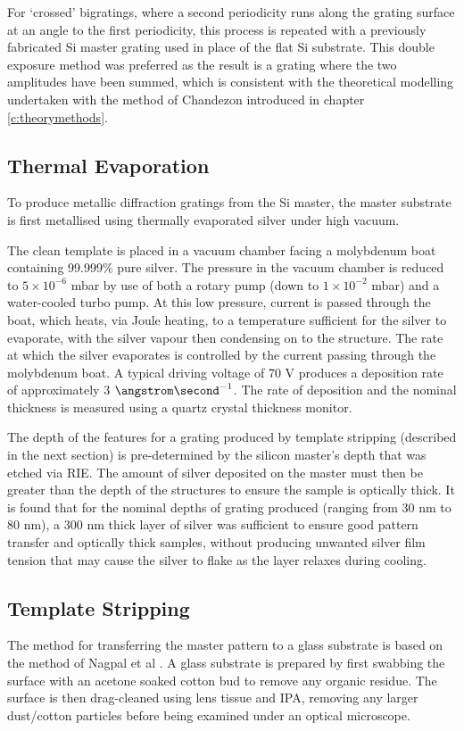For `crossed' bigratings, where a second periodicity runs along the grating surface at an angle to the first periodicity, this process is repeated with a previously fabricated Si master grating used in place of the flat Si substrate. This double exposure method was preferred as the result is a grating where the two amplitudes have been summed, which is consistent with the theoretical modelling undertaken with the method of Chandezon introduced in chapter \ref{c:theorymethods}.
 
\subsection{Thermal Evaporation} 
To produce metallic diffraction gratings from the Si master, the master substrate is first metallised using thermally evaporated silver under high vacuum.

The clean template is placed in a vacuum chamber facing a molybdenum boat containing 99.999\% pure silver. The pressure in the vacuum chamber is reduced to $5\times 10^{-6}$ mbar by use of both a rotary pump (down to $1\times10^{-2}$ mbar) and a water-cooled turbo pump. 
At this low pressure, current is passed through the boat, which heats, via Joule heating, to a temperature sufficient for the silver to evaporate, with the silver vapour then condensing on to the structure. The rate at which the silver evaporates is controlled by the current passing through the molybdenum boat. A typical driving voltage of 70 V produces a deposition rate of approximately 3 $\angstrom \second^{-1}$. The rate of deposition and the nominal thickness is measured using a quartz crystal thickness monitor.

The depth of the features for a grating produced by template stripping (described in the next section) is pre-determined by the silicon master's depth that was etched via RIE. The amount of silver deposited on the master must then be greater than the depth of the structures to ensure the sample is optically thick. It is found that for the nominal depths of grating produced (ranging from 30 nm to 80 nm), a 300 nm thick layer of silver was sufficient to ensure good pattern transfer and optically thick samples, without producing unwanted silver film tension that may cause the silver to flake as the layer relaxes during cooling.

\subsection{Template Stripping}
The method for transferring the master pattern to a glass substrate is based on the method of Nagpal et al \cite{Nagpal2009,Nagpal2009a}. A glass substrate is prepared by first swabbing the surface with an acetone soaked cotton bud to remove any organic residue. The surface is then drag-cleaned using lens tissue and IPA, removing any larger dust/cotton particles before being examined under an optical microscope. 

